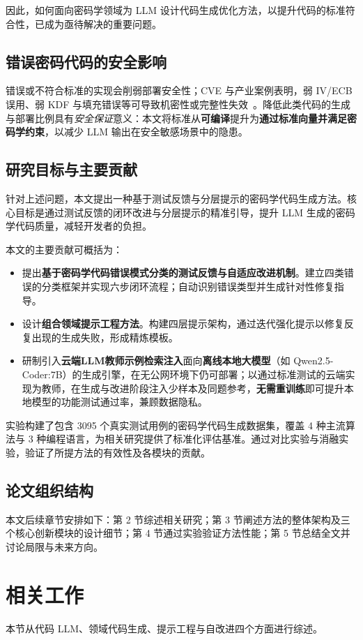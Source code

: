 \documentclass[runningheads]{llncs}
\begin{document}
因此，如何面向密码学领域为 LLM 设计代码生成优化方法，以提升代码的标准符合性，已成为亟待解决的重要问题。

\subsection{错误密码代码的安全影响}
\label{subsec:security_implications}
错误或不符合标准的实现会削弱部署安全性；CVE 与产业案例表明，弱 IV/ECB 误用、弱 KDF 与填充错误等可导致机密性或完整性失效~\cite{secsurvey,cryptollm}。降低此类代码的生成与部署比例具有\emph{安全保证}意义：本文将标准从\textbf{可编译}提升为\textbf{通过标准向量并满足密码学约束}，以减少 LLM 输出在安全敏感场景中的隐患。

\subsection{研究目标与主要贡献}
针对上述问题，本文提出一种基于测试反馈与分层提示的密码学代码生成方法。核心目标是通过测试反馈的闭环改进与分层提示的精准引导，提升 LLM 生成的密码学代码质量，减轻开发者的负担。

本文的主要贡献可概括为：
\begin{itemize}
    \item 提出\textbf{基于密码学代码错误模式分类的测试反馈与自适应改进机制}。建立四类错误的分类框架并实现六步闭环流程；自动识别错误类型并生成针对性修复指导。
    \item 设计\textbf{组合领域提示工程方法}。构建四层提示架构，通过迭代强化提示以修复反复出现的生成失败，形成精炼模板。
    \item 研制引入\textbf{云端LLM教师示例检索注入}面向\textbf{离线本地大模型}（如 Qwen2.5-Coder:7B）的生成引擎，在无公网环境下仍可部署；以通过标准测试的云端实现为教师，在生成与改进阶段注入少样本及同题参考，\textbf{无需重训练}即可提升本地模型的功能测试通过率，兼顾数据隐私。
\end{itemize}
实验构建了包含 3095 个真实测试用例的密码学代码生成数据集，覆盖 4 种主流算法与 3 种编程语言，为相关研究提供了标准化评估基准。通过对比实验与消融实验，验证了所提方法的有效性及各模块的贡献。


\subsection{论文组织结构}
本文后续章节安排如下：第 2 节综述相关研究；第 3 节阐述方法的整体架构及三个核心创新模块的设计细节；第 4 节通过实验验证方法性能；第 5 节总结全文并讨论局限与未来方向。

\section{相关工作}
本节从代码 LLM、领域代码生成、提示工程与自改进四个方面进行综述。
\end{document}
